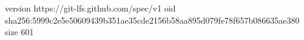 version https://git-lfs.github.com/spec/v1
oid sha256:5999c2e5e50609439b351ae35cde2156b58aa895d079fe78f657b086635ae380
size 601

